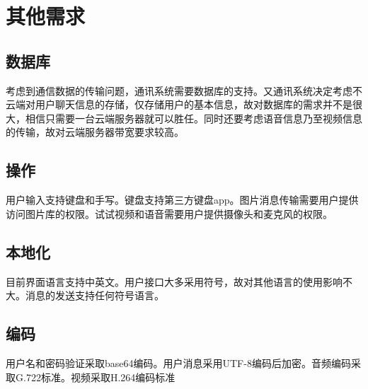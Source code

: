 \chapter{其他需求}
\iffalse
<Any other requirement specified by the customer need to be listed below with appropriate section. This may include Database, Coding requirements, Error handling, Testing requirements etc., Few sample requirements are listed below. Please note, you may remove or add if something is not applicable. >

使用适当的章节，详细说明任何其他客户需求，包括数据库，编码需求，错误处理，测试需求等。下面仅列出了少量样例，你可以删除和增加项目。
\fi
\section{数据库}
考虑到通信数据的传输问题，通讯系统需要数据库的支持。又通讯系统决定考虑不云端对用户聊天信息的存储，仅存储用户的基本信息，故对数据库的需求并不是很大，相信只需要一台云端服务器就可以胜任。同时还要考虑语音信息乃至视频信息的传输，故对云端服务器带宽要求较高。
\section{操作}
用户输入支持键盘和手写。键盘支持第三方键盘app。图片消息传输需要用户提供访问图片库的权限。试试视频和语音需要用户提供摄像头和麦克风的权限。
\section{本地化}
目前界面语言支持中英文。用户接口大多采用符号，故对其他语言的使用影响不大。消息的发送支持任何符号语言。
\section{编码}
用户名和密码验证采取base64编码。用户消息采用UTF-8编码后加密。音频编码采取G.722标准。视频采取H.264编码标准

